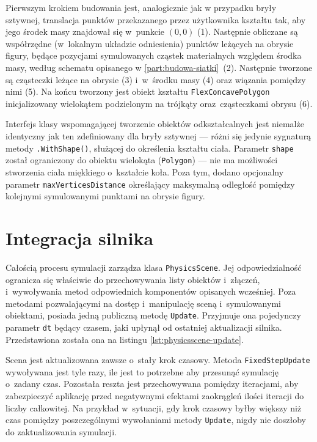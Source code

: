 Pierwszym krokiem budowania jest, analogicznie jak w przypadku bryły sztywnej, translacja punktów przekazanego przez użytkownika kształtu tak, aby jego środek masy znajdował się w~punkcie $(0,0)$ (1).  Następnie obliczane są współrzędne (w~lokalnym układzie odniesienia) punktów leżących na obrysie figury, będące pozycjami symulowanych cząstek materialnych względem środka masy, według schematu opisanego w \ref{part:budowa-siatki}~(2). Następnie tworzone są cząsteczki leżące na obrysie (3) i~w~środku masy (4) oraz wiązania pomiędzy nimi (5). Na końcu tworzony jest obiekt kształtu \verb|FlexConcavePolygon| inicjalizowany wielokątem podzielonym na trójkąty oraz~cząsteczkami obrysu (6). 

Interfejs klasy wspomagającej tworzenie obiektów odkształcalnych jest niemalże identyczny jak ten zdefiniowany dla bryły sztywnej --- różni się jedynie sygnaturą metody \verb|.WithShape()|, służącej do określenia kształtu ciała. Parametr \verb|shape| został ograniczony do obiektu wielokąta (\verb|Polygon|) --- nie ma możliwości stworzenia ciała miękkiego o~kształcie koła. Poza tym, dodano opcjonalny parametr \verb|maxVerticesDistance| określający maksymalną odległość pomiędzy kolejnymi symulowanymi punktami na obrysie figury.
\clearpage


\section{Integracja silnika}
Całością procesu symulacji zarządza klasa \verb|PhysicsScene|. Jej odpowiedzialność ogranicza się właściwie do przechowywania listy obiektów i~złączeń, i~wywoływania metod odpowiednich komponentów opisanych wcześniej. Poza metodami pozwalającymi na dostęp i~manipulację sceną i~symulowanymi obiektami, posiada jedną publiczną metodę \verb|Update|. Przyjmuje ona pojedynczy parametr \verb|dt| będący czasem, jaki upłynął od ostatniej aktualizacji silnika. Przedstawiona została ona na listingu \ref{lst:physicsscene-update}.

Scena jest aktualizowana zawsze o~stały krok czasowy. Metoda \verb|FixedStepUpdate| wywoływana jest tyle razy, ile jest to potrzebne aby przesunąć symulację o~zadany czas. Pozostała reszta jest przechowywana pomiędzy iteracjami, aby zabezpieczyć aplikację przed negatywnymi efektami zaokrągleń ilości iteracji do liczby całkowitej. Na przykład w~sytuacji, gdy krok czasowy byłby większy niż czas pomiędzy poszczególnymi wywołaniami metody \verb|Update|, nigdy nie doszłoby do zaktualizowania symulacji. 

